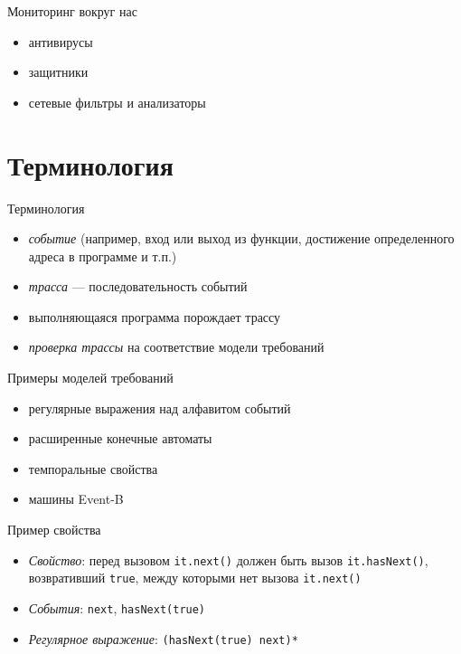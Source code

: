 \documentclass[hyperref={unicode=true}]{beamer}
\begin{document}
    \begin{frame}{Мониторинг вокруг нас}
    \begin{itemize}
        \item антивирусы
        \item защитники
        \item сетевые фильтры и анализаторы
    \end{itemize}
    \end{frame}

    \section{Терминология}

    \begin{frame}{Терминология}
    \begin{itemize}
        \item \emph{событие} (например, вход или выход
                из функции, достижение определенного адреса
                в программе и т.п.)
        \item \emph{трасса} --- последовательность событий
        \item выполняющаяся программа порождает трассу
        \item \emph{проверка трассы} на соответствие модели
        требований
    \end{itemize}
    \end{frame}

    \begin{frame}{Примеры моделей требований}
    \begin{itemize}
        \item регулярные выражения над алфавитом событий
        \item расширенные конечные автоматы
        \item темпоральные свойства
        \item машины Event-B
    \end{itemize}
    \end{frame}

    \begin{frame}{Пример свойства}
    \begin{itemize}
    \item \emph{Свойство}: перед вызовом \texttt{it.next()}
    должен быть вызов \texttt{it.hasNext()}, возвративший
    \texttt{true}, между которыми нет вызова \texttt{it.next()}
    \item \emph{События}: \texttt{next}, \texttt{hasNext(true)}
    \item \emph{Регулярное выражение}: \texttt{(hasNext(true) next)*}
    \end{itemize}
    \end{frame}
\end{document}
